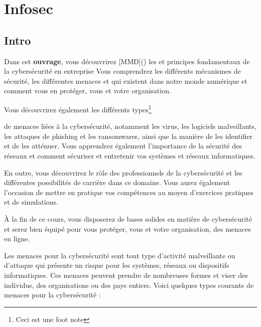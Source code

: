 \chapter{Infosec}
\section{Intro}
Dans cet \textbf{ouvrage}, vous découvrirez [MMD]() les  et principes fondamentaux de la cybersécurité en entreprise Vous comprendrez les différents mécanismes de sécurité, les différentes menaces et  qui existent dans notre monde numérique et comment vous en protéger, vous et votre organisation.



Vous découvrirez également les différents types\footnote{Ceci est une foot note} 


de menaces liées à la cybersécurité, notamment les virus, les logiciels malveillants, les attaques de phishing et les ransomwares, ainsi que la manière de les identifier et de les atténuer. Vous apprendrez également l'importance de la sécurité des réseaux et comment sécuriser et entretenir vos systèmes et réseaux informatiques.

En outre, vous découvrirez le rôle des professionnels de la cybersécurité et les différentes possibilités de carrière dans ce domaine. Vous aurez également l'occasion de mettre en pratique vos compétences au moyen d'exercices pratiques et de simulations.

À la fin de ce cours, vous disposerez de bases solides en matière de cybersécurité et serez bien équipé pour vous protéger, vous et votre organisation, des menaces en ligne.


Les menaces pour la cybersécurité sont tout type d'activité malveillante ou d'attaque qui présente un risque pour les systèmes, réseaux ou dispositifs informatiques. Ces menaces peuvent prendre de nombreuses formes et viser des individus, des organisations ou des pays entiers. Voici quelques types courants de menaces pour la cybersécurité :

